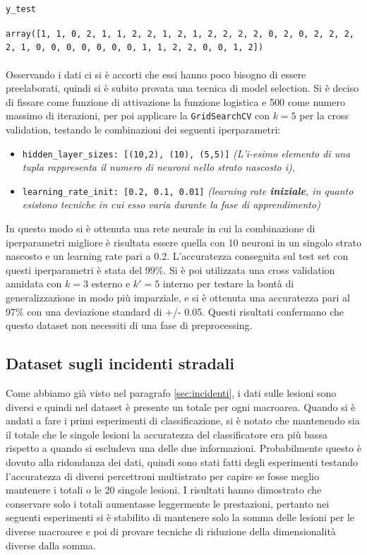 \documentclass[12pt, twoside, letterpaper]{report}
\begin{document}
			\begin{lstlisting}[language=Python, gobble=8]
				y_test
			\end{lstlisting}
			\texttt{array([1, 1, 0, 2, 1, 1, 2, 2, 1, 2, 1, 2, 2, 2, 2, 0, 2, 0, 2, 2, 2, 2, 1, 0, 0, 0, 0, 0, 0, 0, 1, 1, 2, 2, 0, 0, 1, 2])}\\\\
			Osservando i dati ci si è accorti che essi hanno poco bisogno di essere preelaborati, quindi si è subito provata una tecnica di model selection. Si è deciso di fissare come funzione di attivazione la funzione logistica e 500 come numero massimo di iterazioni, per poi applicare la \texttt{GridSearchCV} con $k=5$ per la cross validation, testando le combinazioni dei seguenti iperparametri:
			\begin{itemize}
				\item \texttt{hidden\_layer\_sizes: [(10,2), (10), (5,5)]} \textit{(L'i-esimo elemento di una tupla rappresenta il numero di neuroni nello strato nascosto i)},
	    		\item \texttt{learning\_rate\_init: [0.2, 0.1, 0.01]} \textit{(learning rate \textbf{iniziale}, in quanto esistono tecniche in cui esso varia durante la fase di apprendimento)}
			\end{itemize}
			In questo modo si è ottenuta una rete neurale in cui la combinazione di iperparametri migliore è risultata essere quella con 10 neuroni in un singolo strato nascosto e un learning rate pari a 0.2. L'accuratezza conseguita sul test set con questi iperparametri è  stata del 99\%. Si è poi utilizzata una cross validation annidata con $k = 3$ esterno e $k' = 5$  interno per testare la bontà di generalizzazione in modo più imparziale, e si è ottenuta una accuratezza pari al 97\% con una deviazione standard di +/- 0.05. Questi risultati confermano che questo	dataset non necessiti di una fase di preprocessing.
			
		\subsection{Dataset sugli incidenti stradali}
			Come abbiamo già visto nel paragrafo \ref{sec:incidenti}, i dati sulle lesioni sono diversi e quindi nel dataset è presente un totale per ogni macroarea. Quando si è andati a fare i primi esperimenti di classificazione, si è notato che mantenendo sia il totale che le singole lesioni la accuratezza del classificatore era più bassa rispetto a quando si escludeva una delle due informazioni. Probabilmente questo è dovuto alla ridondanza dei dati, quindi sono stati fatti degli esperimenti testando l'accuratezza di diversi percettroni multistrato per capire se fosse meglio mantenere i totali o le 20 singole lesioni. I risultati hanno dimostrato che conservare solo i totali aumentasse leggermente le prestazioni, pertanto nei seguenti esperimenti si è stabilito di mantenere solo la somma delle lesioni per le diverse macroaree e poi di provare tecniche di riduzione della dimensionalità diverse dalla somma.
			
\end{document}

